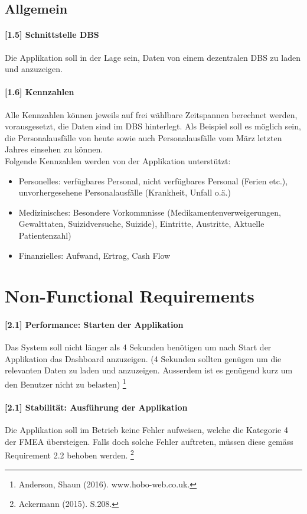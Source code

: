 \documentclass[a4paper]{scrreprt}
\begin{document}
\subsection{Allgemein}
\paragraph{[1.5] Schnittstelle DBS}
Die Applikation soll in der Lage sein, Daten von einem dezentralen DBS zu laden und anzuzeigen. 

\paragraph{[1.6] Kennzahlen}
Alle Kennzahlen können jeweils auf frei wählbare Zeitspannen berechnet werden, vorausgesetzt, die Daten sind im DBS hinterlegt. Als Beispiel soll es möglich sein, die Personalausfälle von heute sowie auch Personalausfälle vom März letzten Jahres einsehen zu können. \\
Folgende Kennzahlen werden von der Applikation unterstützt:
\begin{itemize}
\item Personelles: verfügbares Personal, nicht verfügbares Personal (Ferien etc.), unvorhergesehene Personalausfälle (Krankheit, Unfall o.ä.)
\item Medizinisches: Besondere Vorkommnisse (Medikamentenverweigerungen, Gewalttaten, Suizidversuche, Suizide), Eintritte, Austritte, Aktuelle Patientenzahl)
\item Finanzielles: Aufwand, Ertrag, Cash Flow
\end{itemize}

\section{Non-Functional Requirements}
\paragraph{[2.1] Performance: Starten der Applikation}
Das System soll nicht länger als 4 Sekunden benötigen um nach Start der Applikation das Dashboard anzuzeigen. (4 Sekunden sollten genügen um die relevanten Daten zu laden und anzuzeigen. Ausserdem ist es genügend kurz um den Benutzer nicht zu belasten)
\footnote{Anderson, Shaun (2016). www.hobo-web.co.uk.}

\paragraph{[2.1] Stabilität: Ausführung der Applikation}
Die Applikation soll im Betrieb keine Fehler aufweisen, welche die Kategorie 4 der FMEA übersteigen. Falls doch solche Fehler auftreten, müssen diese gemäss Requirement 2.2 behoben werden. 
\footnote{Ackermann (2015). S.208.}
\end{document}
